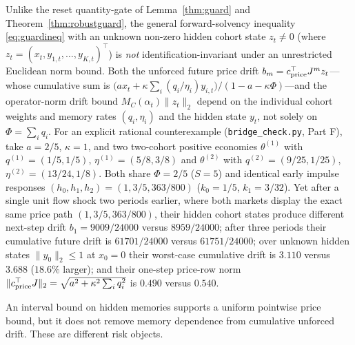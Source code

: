 Unlike the reset quantity-gate of Lemma~\ref{thm:guard} and Theorem~\ref{thm:robustguard}, the general forward-solvency inequality \eqref{eq:guardineq} with an unknown non-zero hidden cohort state $z_t\neq 0$ (where $z_t=(x_t,y_{1,t},\ldots,y_{K,t})^\top$) is \emph{not} identification-invariant under an unrestricted Euclidean norm bound. Both the unforced future price drift $b_m=c_{\rm price}^\top J^m z_t$---whose cumulative sum is $\bigl(a x_t+\kappa\sum_i(q_i/\eta_i)y_{i,t}\bigr)/(1-a-\kappa\Phi)$---and the operator-norm drift bound $M_C(\alpha_t)\|z_t\|_2$ depend on the individual cohort weights and memory rates $(q_i,\eta_i)$ and the hidden state $y_t$, not solely on $\Phi=\sum_i q_i$. For an explicit rational counterexample (\texttt{bridge\_check.py}, Part F), take $a=2/5$, $\kappa=1$, and two two-cohort positive economies $\theta^{(1)}$ with $q^{(1)}=(1/5,1/5)$, $\eta^{(1)}=(5/8,3/8)$ and $\theta^{(2)}$ with $q^{(2)}=(9/25,1/25)$, $\eta^{(2)}=(13/24,1/8)$. Both share $\Phi=2/5$ ($S=5$) and identical early impulse responses $(h_0,h_1,h_2)=(1,3/5,363/800)$ ($k_0=1/5$, $k_1=3/32$). Yet after a single unit flow shock two periods earlier, where both markets display the exact same price path $(1,3/5,363/800)$, their hidden cohort states produce different next-step drift $b_1=9009/24000$ versus $8959/24000$; after three periods their cumulative future drift is $61701/24000$ versus $61751/24000$; over unknown hidden states $\|y_0\|_2\le 1$ at $x_0=0$ their worst-case cumulative drift is $3.110$ versus $3.688$ ($18.6\%$ larger); and their one-step price-row norm $\|c_{\rm price}^\top J\|_2=\sqrt{a^2+\kappa^2\sum_i q_i^2}$ is $0.490$ versus $0.540$.

An interval bound on hidden memories supports a uniform pointwise price bound, but it does not remove memory dependence from cumulative unforced drift. These are different risk objects.


